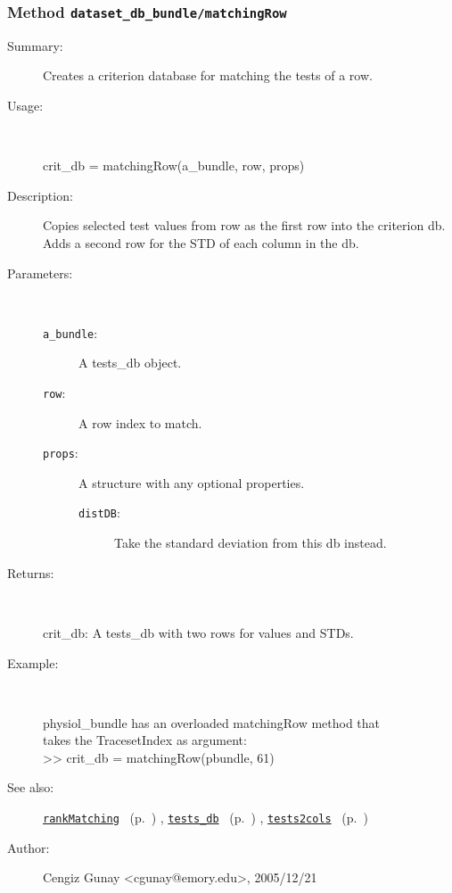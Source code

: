 \subsubsection[Method \texttt{matchingRow}]{Method \texttt{dataset\_db\_bundle/matchingRow}}%
%
\label{ref_dataset_db_bundle__matchingRow}%
\hypertarget{ref_dataset_db_bundle__matchingRow}{}%
\begin{description}
\item[Summary:]Creates a criterion database for matching the tests of a row.
%
\item[Usage:]~%
\begin{lyxcode}%
crit\_db = matchingRow(a\_bundle, row, props)
%
\end{lyxcode}%
%
\item[Description:]%
Copies selected test values from row as the first row into the 
 criterion db. Adds a second row for the STD of each column in the db.
\item[Parameters:]~
\begin{description}%
\item[\texttt{a\_bundle}:]
 A tests\_db object.
\item[\texttt{row}:]
 A row index to match.
\item[\texttt{props}:]
 A structure with any optional properties.
\begin{description}%
\item[\texttt{distDB}:]
 Take the standard deviation from this db instead.
\end{description}%
\end{description}%
%
\item[Returns:]~

	crit\_db: A tests\_db with two rows for values and STDs.
%
\item[Example:]~
\begin{lyxcode}        physiol\_bundle has an overloaded matchingRow method that\\%
        takes the TracesetIndex as argument:\\%
        >> crit\_db = matchingRow(pbundle, 61)\\%
\end{lyxcode}
%
\item[See also:]%
\hyperlink{ref_rankMatching}{\texttt{rankMatching}}%
\ (p.~\pageref{ref_rankMatching})%
%
, \hyperlink{ref_tests_db}{\texttt{tests\_db}}%
\ (p.~\pageref{ref_tests_db})%
%
, \hyperlink{ref_tests2cols}{\texttt{tests2cols}}%
\ (p.~\pageref{ref_tests2cols})%
%
%
\item[Author:]%
Cengiz Gunay <cgunay@emory.edu>, 2005/12/21%
\end{description}
\methodline%
